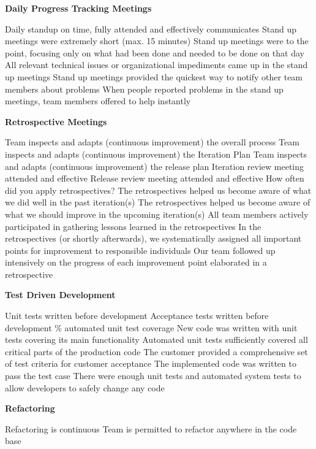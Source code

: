 \textbf{Daily Progress Tracking Meetings}
\begin{itemize}
	\taa Daily standup on time, fully attended and effectively communicates
	\pam Stand up meetings were extremely short (max. 15 minutes) 
	\pam Stand up meetings were to the point, focusing only on what had been done and needed to be done on that day 
	\pamr All relevant technical issues or organizational impediments came up in the stand up meetings 
	\pamr Stand up meetings provided the quickest way to notify other team members about problems 
	\pamr When people reported problems in the stand up meetings, team members offered to help instantly 
\end{itemize}

\textbf{Retrospective Meetings}
\begin{itemize}
	\taa Team inspects and adapts (continuous improvement) the overall process
	\taa Team inspects and adapts (continuous improvement) the Iteration Plan 
	\taa Team inspects and adapts (continuous improvement) the release plan
	\taa Iteration review meeting attended and effective
	\taa Release review meeting attended and effective
	\pam How often did you apply retrospectives?
	\pam The retrospectives helped us become aware of what we did well in the past iteration(s)
	\pam The retrospectives helped us become aware of what we should improve in the upcoming iteration(s) 
	\pam All team members actively participated in gathering lessons learned in the retrospectives
	\pamr In the retrospectives (or shortly afterwards), we systematically assigned all important points for improvement to responsible individuals 
	\pamr Our team followed up intensively on the progress of each improvement point elaborated in a retrospective
\end{itemize}

\textbf{Test Driven Development}
\begin{itemize}
	\taa Unit tests written before development
	\taa Acceptance tests written before development
	\% automated unit test coverage
	\pam New code was written with unit tests covering its main functionality
	\pam Automated unit tests sufficiently covered all critical parts of the production code
	\pam The customer provided a comprehensive set of test criteria for customer acceptance
	\pam The implemented code was written to pass the test case
	\pamr There were enough unit tests and automated system tests to allow developers to safely change any code
\end{itemize}

\textbf{Refactoring}
\begin{itemize}
	\taa Refactoring is continuous
	\taa Team is permitted to refactor anywhere in the code base
\end{itemize}

